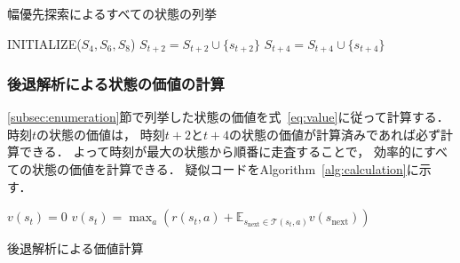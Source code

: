 \begin{algorithm}[tb]
\caption{幅優先探索によるすべての状態の列挙}
\label{alg:bfs}
\begin{algorithmic}[1]
    \State INITIALIZE($S_4, S_6, S_8$)
                    \State $S_{t+2} = S_{t+2} \cup \{s_{t+2}\}$
                \EndIf
            \EndFor
                    \State $S_{t+4} = S_{t+4} \cup \{s_{t+4}\}$
                \EndIf
            \EndFor
        \EndFor
    \EndFor
\EndFunction
\end{algorithmic}
\end{algorithm}

\subsubsection{後退解析による状態の価値の計算}
\label{subsec:calculation}
\ref{subsec:enumeration}節で列挙した状態の価値を式~\ref{eq:value}に従って計算する．
時刻$t$の状態の価値は， 時刻$t+2$と$t+4$の状態の価値が計算済みであれば必ず計算できる．
よって時刻が最大の状態から順番に走査することで， 効率的にすべての状態の価値を計算できる．
疑似コードをAlgorithm~\ref{alg:calculation}に示す．
\begin{algorithm}[tb]
    \begin{algorithmic}[1]
                    \State $v(s_t) = 0$
                \Else {}
                    \State $v(s_t) = \max_a \left(r(s_t,a) + \mathbb{E}_{s_\text{next} \in \mathcal{T}(s_t,a)} v(s_\text{next}) \right)$
                \EndIf
            \EndFor
        \EndFor
    \EndFunction
    \end{algorithmic}
    \caption{後退解析による価値計算}
    \label{alg:calculation}
\end{algorithm}

